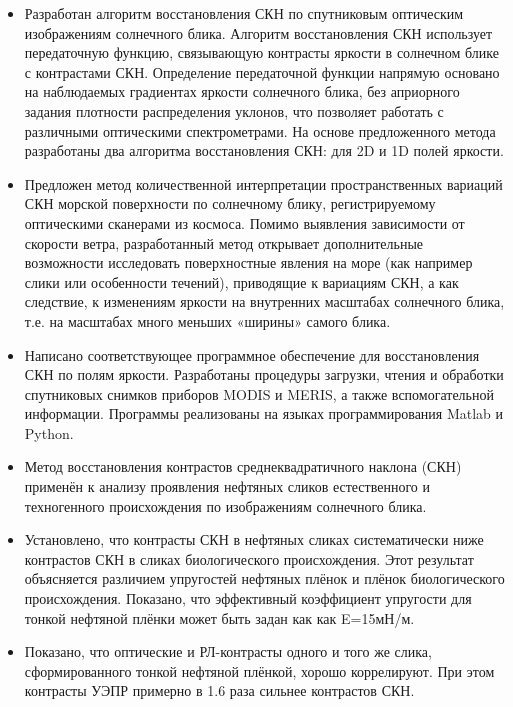 \begin{itemize}

\item Разработан алгоритм восстановления СКН по спутниковым оптическим изображениям солнечного блика. Алгоритм восстановления СКН использует передаточную функцию, связывающую контрасты яркости в солнечном блике с контрастами СКН. Определение передаточной функции напрямую основано на наблюдаемых градиентах яркости солнечного блика, без априорного задания плотности распределения уклонов, что позволяет работать с различными оптическими спектрометрами. На основе предложенного метода разработаны два алгоритма восстановления СКН: для 2D и 1D полей яркости.

\item Предложен метод количественной интерпретации пространственных вариаций СКН морской поверхности по солнечному блику, регистрируемому оптическими сканерами из космоса. Помимо выявления зависимости от скорости ветра, разработанный метод открывает дополнительные возможности исследовать поверхностные явления на море (как например слики или особенности течений), приводящие к вариациям СКН, а как следствие, к изменениям яркости на внутренних масштабах солнечного блика, т.е. на масштабах много меньших «ширины» самого блика.

\item Написано соответствующее программное обеспечение для восстановления СКН по полям яркости. Разработаны процедуры загрузки, чтения и обработки спутниковых снимков приборов MODIS и MERIS, а также вспомогательной информации. Программы реализованы на языках программирования Matlab и Python.

\item Метод восстановления контрастов среднеквадратичного наклона (СКН) применён к анализу проявления нефтяных сликов естественного и техногенного происхождения по изображениям солнечного блика.

\item Установлено, что контрасты СКН в нефтяных сликах систематически ниже контрастов СКН в сликах биологического происхождения. Этот результат объясняется различием упругостей нефтяных плёнок и плёнок биологического происхождения. Показано, что эффективный коэффициент упругости для тонкой нефтяной плёнки может быть задан как как E=15мН/м.

\item Показано, что оптические и РЛ-контрасты одного и того же слика, сформированного тонкой нефтяной плёнкой, хорошо коррелируют. При этом контрасты УЭПР примерно в 1.6 раза сильнее контрастов СКН.


\end{itemize}
